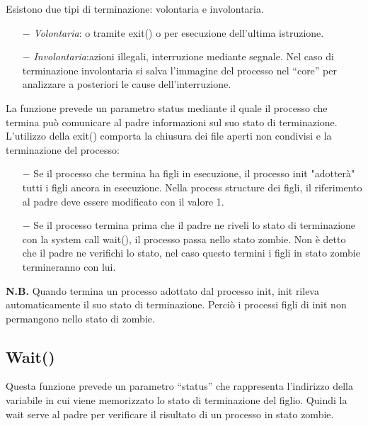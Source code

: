 \documentclass{article}
\begin{document}
\noindent Esistono due tipi di terminazione: volontaria e involontaria. 
\begin{itemize}
    \item[$-$] \textit{Volontaria}: o tramite exit() o per esecuzione dell'ultima 
    istruzione. 
    \item[$-$] \textit{Involontaria}:azioni illegali, interruzione mediante
    segnale. Nel caso di terminazione involontaria si salva l'immagine del
    processo nel “core” per analizzare a posteriori le cause dell'interruzione.
    
\end{itemize}
\noindent La funzione prevede un parametro status mediante il quale il processo
che termina può comunicare al padre informazioni sul suo stato di terminazione.
L'utilizzo della exit() comporta la chiusura dei file aperti non condivisi e 
la terminazione del processo:
\begin{itemize}
    \item[$-$] Se il processo che termina ha figli in esecuzione, 
    il processo init "adotterà" tutti i figli ancora in esecuzione.
    Nella process structure dei figli, il riferimento al padre deve essere 
    modificato con il valore 1.
    \item[$-$] Se il processo termina prima che il padre ne riveli lo stato
    di terminazione con la system call wait(), il processo passa nello stato
    zombie. Non è detto che il padre ne verifichi lo stato, nel caso questo 
    termini i figli in stato zombie termineranno con lui.
\end{itemize}

\textbf{N.B.} Quando termina un processo adottato dal processo init, init 
rileva automaticamente il suo stato di terminazione. Perciò i processi figli di
init non permangono nello stato di zombie.

\subsection{Wait()}

\noindent{}
\medskip

\noindent Questa funzione prevede un parametro “status” che rappresenta 
l'indirizzo della variabile in cui viene memorizzato lo stato di terminazione 
del figlio. Quindi la wait serve al padre per verificare il risultato di un 
processo in stato zombie.
\end{document}
